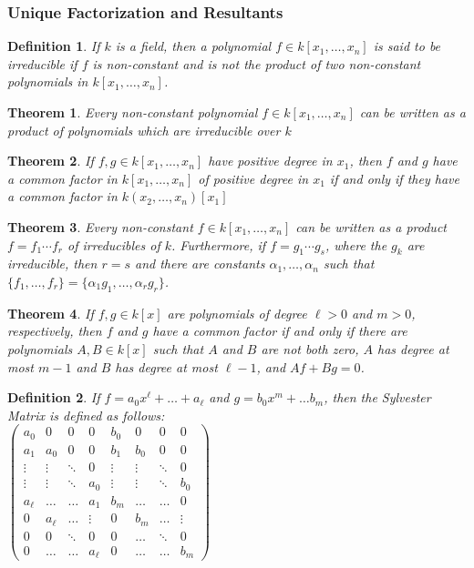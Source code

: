 \documentclass[oneside]{book}
\theoremstyle{mystyle}
\newtheorem{theorem}{Theorem}[section]
\newtheorem{definition}{Definition}[section]
\begin{document}
\subsubsection{Unique Factorization and Resultants}
\begin{definition}
If $k$ is a field, then a polynomial $f\in k[x_1,\hdots ,x_n]$ is said to be irreducible if $f$ is non-constant and is not the product of two non-constant polynomials in $k[x_1,\hdots ,x_n]$.
\end{definition}
\begin{theorem}
Every non-constant polynomial $f\in k[x_1,\hdots ,x_n]$ can be written as a product of polynomials which are irreducible over $k$
\end{theorem}
\begin{theorem}
If $f,g\in k[x_1,\hdots ,x_n]$ have positive degree in $x_1$, then $f$ and $g$ have a common factor in $k[x_1,\hdots ,x_n]$ of positive degree in $x_1$ if and only if they have a common factor in $k(x_2,\hdots, x_n)[x_1]$
\end{theorem}
\begin{theorem}
Every non-constant $f\in k[x_1,\hdots ,x_n]$ can be written as a product $f = f_1\cdots f_r$ of irreducibles of $k$. Furthermore, if $f = g_1\cdots g_s$, where the $g_k$ are irreducible, then $r=s$ and there are constants $\alpha_1,\hdots, \alpha_n$ such that $\{f_1,\hdots, f_r\} = \{\alpha_1 g_1, \hdots, \alpha_r g_r\}$.
\end{theorem}
\begin{theorem}
If $f,g \in k[x]$ are polynomials of degree $\ell>0$ and $m>0$, respectively, then $f$ and $g$ have a common factor if and only if there are polynomials $A,B\in k[x]$ such that $A$ and $B$ are not both zero, $A$ has degree at most $m-1$ and $B$ has degree at most $\ell-1$, and $Af+Bg = 0$.
\end{theorem}
\begin{definition}
If $f = a_0 x^{\ell} +\hdots + a_{\ell}$ and $g = b_0 x^m + \hdots b_m$, then the Sylvester Matrix is defined as follows:\\$
\left({\begin{matrix} a_0 & 0 & 0 & 0 & b_0 & 0 & 0 & 0 \\ a_1 & a_0 & 0 & 0 & b_1 & b_0 & 0 & 0 \\ \vdots & \vdots & \ddots & 0 & \vdots & \vdots & \ddots & 0 \\ \vdots & \vdots & \ddots & a_{0} & \vdots & \vdots & \ddots & b_0 \\ a_{\ell} & \hdots & \hdots & a_{1} & b_{m} & \hdots & \hdots & 0 \\ 0 & a_{\ell} & \hdots & \vdots & 0 & b_{m} & \hdots & \vdots\\ 0 & 0 & \ddots & 0 & 0 & \hdots & \ddots & 0 \\ 0 & \hdots & \hdots & a_{\ell} & 0 & \hdots & \hdots & b_{m} \end{matrix}}\right)$ 
\end{definition}
\end{document}
